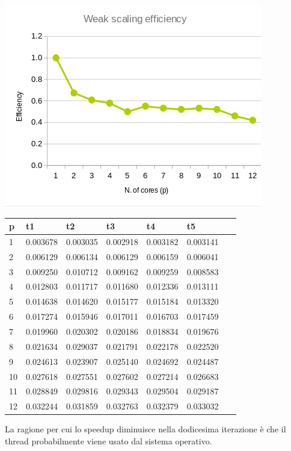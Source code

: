 \documentclass[a4paper,11pt, twoside]{report}
\begin{document}
\includegraphics[scale=0.5]{images/mpi_weak.png}
\begin{table}[!ht]
    \centering
    \begin{tabular}{|l|l|l|l|l|l|l|}
    \hline
        p & t1 & t2 & t3 & t4 & t5 & ~ \\ \hline
        1 & 0.003678 & 0.003035 & 0.002918 & 0.003182 & 0.003141 & ~ \\ \hline
        2 & 0.006129 & 0.006134 & 0.006129 & 0.006159 & 0.006041 & ~ \\ \hline
        3 & 0.009250 & 0.010712 & 0.009162 & 0.009259 & 0.008583 & ~ \\ \hline
        4 & 0.012803 & 0.011717 & 0.011680 & 0.012336 & 0.013111 & ~ \\ \hline
        5 & 0.014638 & 0.014620 & 0.015177 & 0.015184 & 0.013320 & ~ \\ \hline
        6 & 0.017274 & 0.015946 & 0.017011 & 0.016703 & 0.017459 & ~ \\ \hline
        7 & 0.019960 & 0.020302 & 0.020186 & 0.018834 & 0.019676 & ~ \\ \hline
        8 & 0.021634 & 0.029037 & 0.021791 & 0.022178 & 0.022520 & ~ \\ \hline
        9 & 0.024613 & 0.023907 & 0.025140 & 0.024692 & 0.024487 & ~ \\ \hline
        10 & 0.027618 & 0.027551 & 0.027602 & 0.027214 & 0.026683 & ~ \\ \hline
        11 & 0.028849 & 0.029816 & 0.029343 & 0.029504 & 0.029187 & ~ \\ \hline
        12 & 0.032244 & 0.031859 & 0.032763 & 0.032379 & 0.033032 & ~ \\ \hline
    \end{tabular}
\end{table}
\newline
La ragione per cui lo speedup diminuisce nella dodicesima iterazione è che il thread probabilmente viene usato dal sistema operativo.
\end{document}

